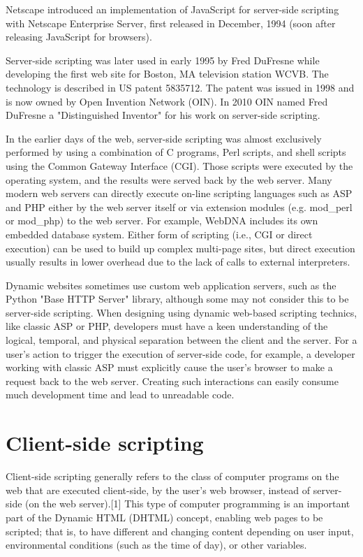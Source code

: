 Netscape introduced an implementation of JavaScript for server-side scripting with Netscape Enterprise Server, first released in December, 1994 (soon after releasing JavaScript for browsers).

Server-side scripting was later used in early 1995 by Fred DuFresne while developing the first web site for Boston, MA television station WCVB. The technology is described in US patent 5835712. The patent was issued in 1998 and is now owned by Open Invention Network (OIN). In 2010 OIN named Fred DuFresne a "Distinguished Inventor" for his work on server-side scripting.


In the earlier days of the web, server-side scripting was almost exclusively performed by using a combination of C programs, Perl scripts, and shell scripts using the Common Gateway Interface (CGI). Those scripts were executed by the operating system, and the results were served back by the web server. Many modern web servers can directly execute on-line scripting languages such as ASP and PHP either by the web server itself or via extension modules (e.g. mod\_perl or mod\_php) to the web server. For example, WebDNA includes its own embedded database system. Either form of scripting (i.e., CGI or direct execution) can be used to build up complex multi-page sites, but direct execution usually results in lower overhead due to the lack of calls to external interpreters.

Dynamic websites sometimes use custom web application servers, such as the Python "Base HTTP Server" library, although some may not consider this to be server-side scripting. When designing using dynamic web-based scripting technics, like classic ASP or PHP, developers must have a keen understanding of the logical, temporal, and physical separation between the client and the server. For a user's action to trigger the execution of server-side code, for example, a developer working with classic ASP must explicitly cause the user's browser to make a request back to the web server. Creating such interactions can easily consume much development time and lead to unreadable code.



\section{Client-side scripting}


Client-side scripting\cite{client_side_scripting} generally refers to the class of computer programs on the web that are executed client-side, by the user's web browser, instead of server-side (on the web server).[1] This type of computer programming is an important part of the Dynamic HTML (DHTML) concept, enabling web pages to be scripted; that is, to have different and changing content depending on user input, environmental conditions (such as the time of day), or other variables.


